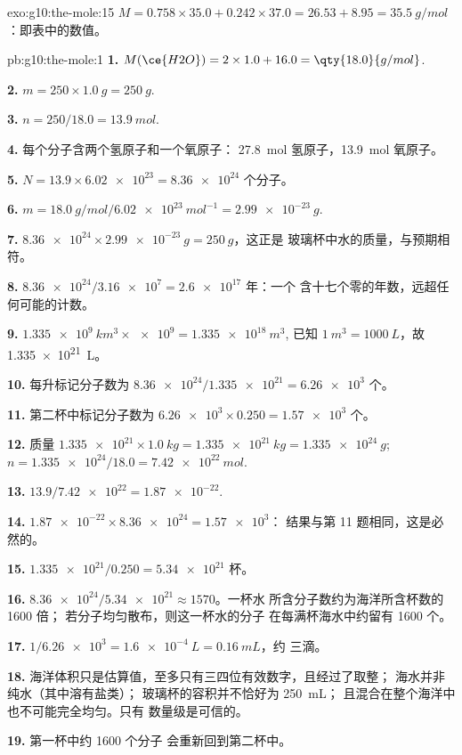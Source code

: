 \begin{solution}{exo:g10:the-mole:15}
$M = 0.758 \times 35.0 + 0.242 \times 37.0 = 26.53 + 8.95 =
\qty{35.5}{g/mol}$：即表中的数值。
\end{solution}

\begin{solution}{pb:g10:the-mole:1}
\textbf{1.} $M(\ce{H2O}) = 2 \times 1.0 + 16.0 = \qty{18.0}{g/mol}$.

\textbf{2.} $m = 250 \times \qty{1.0}{g} = \qty{250}{g}$.

\textbf{3.} $n = 250 / 18.0 = \qty{13.9}{mol}$.

\textbf{4.} 每个分子含两个氢原子和一个氧原子：
\qty{27.8}{mol} 氢原子，\qty{13.9}{mol} 氧原子。

\textbf{5.} $N = 13.9 \times \num{6.02e23} = \num{8.36e24}$ 个分子。

\textbf{6.} $m = \qty{18.0}{g/mol} / \qty{6.02e23}{mol^{-1}} =
\qty{2.99e-23}{g}$.

\textbf{7.} $\num{8.36e24} \times \qty{2.99e-23}{g} = \qty{250}{g}$，这正是
玻璃杯中水的质量，与预期相符。

\textbf{8.} $\num{8.36e24} / \num{3.16e7} = \num{2.6e17}$ 年：一个
含十七个零的年数，远超任何可能的计数。

\textbf{9.} $\qty{1.335e9}{km^3} \times \num{e9} = \qty{1.335e18}{m^3}$,
已知 $\qty{1}{m^3} = \qty{1000}{L}$，故 \qty{1.335e21}{L}。

\textbf{10.} 每升标记分子数为 $\num{8.36e24} / \num{1.335e21} = \num{6.26e3}$
个。

\textbf{11.} 第二杯中标记分子数为 $\num{6.26e3} \times 0.250 = \num{1.57e3}$
个。

\textbf{12.} 质量 $\num{1.335e21} \times \qty{1.0}{kg} =
\qty{1.335e21}{kg} = \qty{1.335e24}{g}$; $n = \num{1.335e24} / 18.0 =
\qty{7.42e22}{mol}$.

\textbf{13.} $13.9 / \num{7.42e22} = \num{1.87e-22}$.

\textbf{14.} $\num{1.87e-22} \times \num{8.36e24} = \num{1.57e3}$：
结果与第 11 题相同，这是必然的。

\textbf{15.} $\num{1.335e21} / 0.250 = \num{5.34e21}$ 杯。

\textbf{16.} $\num{8.36e24} / \num{5.34e21} \approx 1570$。一杯水
所含分子数约为海洋所含杯数的 1600 倍；
若分子均匀散布，则这一杯水的分子
在每满杯海水中约留有 1600 个。

\textbf{17.} $1 / \num{6.26e3} = \qty{1.6e-4}{L} = \qty{0.16}{mL}$，约
三滴。

\textbf{18.} 海洋体积只是估算值，至多只有三四位有效数字，且经过了取整；
海水并非纯水（其中溶有盐类）；
玻璃杯的容积并不恰好为 \qty{250}{mL}；
且混合在整个海洋中也不可能完全均匀。只有
数量级是可信的。

\textbf{19.} 第一杯中约 1600 个分子
会重新回到第二杯中。
\end{solution}
